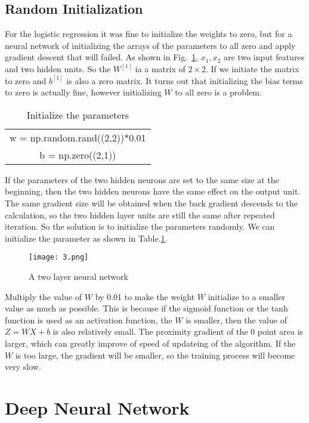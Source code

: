 \documentclass[a4paper]{article}
\begin{document}
\subsection{Random Initialization}
For the logistic regression it was fine to initialize the 
weights to zero, but for a neural network of initializing the arrays of the parameters to all zero and apply gradient descent that will failed. As shown in Fig.~\ref{fig3}, $x_1 , x_2$ are two input features and two hidden units. So the
$W^{\left[1\right]}$ ia a matrix of $2\times2$. If we initiate the matrix to zero and $b^{\left[1\right]}$ is also a zero matrix. It turns out that initializing the bias terms to zero is actually fine, however initializing $W$ to 
all zero is a problem. 
%
\begin{table}[ht]
	\caption{Initialize the parameters}
	\centering
	\begin{tabular}{c}
		\hline
		w = np.random.rand((2,2))$\ast$0.01\\
		b = np.zero((2,1))\\
		\hline	
	\end{tabular}
    \label{tb1}

\end{table}
\par
If the parameters of the two hidden neurons are set to the same size at the beginning, then the two hidden neurons have the same effect on the output unit. The same gradient size will be obtained when the back gradient descends to the calculation, so the two hidden layer units are still the same after repeated iteration.
So the solution is to initialize the parameters randomly. We
can initialize the parameter as shown in Table.\ref{tb1}.
\begin{figure}[ht]
	\centering
	\texttt{[image: 3.png]}
    \caption{A two layer neural network}
    \label{fig3}
\end{figure}
\par 
  Multiply the value of $W$ by 0.01 to make the weight $W$ initialize to a smaller value as much as possible. This is because if the sigmoid function or the tanh function is used as an activation function, the $W$ is smaller, then the value of $Z = WX+b$ is also relatively small.  The proximity gradient of the 0 point area is larger, which can greatly improve of speed of updateing of the algorithm. If the $W$ is too large, the gradient will be smaller, so the training process will become very slow.
\section{Deep Neural Network}
\end{document}
